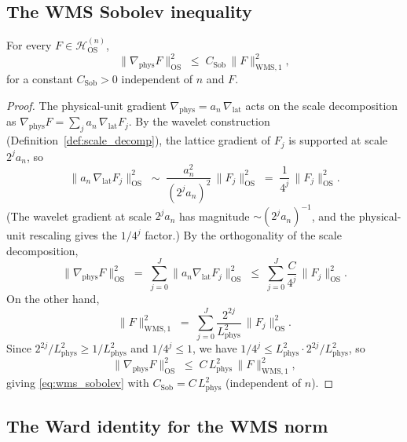 \subsection{The WMS Sobolev inequality}
\label{ssec:wms_sobolev}

\begin{theorem}
\label{thm:wms_sobolev}
For every $F\in\mathcal{H}_{\mathrm{OS}}^{(n)}$,
\begin{equation}
\label{eq:wms_sobolev}
  \|\nabla_{\mathrm{phys}}F\|_{\mathrm{OS}}^{2}
  \;\le\;C_{\mathrm{Sob}}\,\|F\|_{\mathrm{WMS},1}^{2},
\end{equation}
for a constant $C_{\mathrm{Sob}}>0$ independent of $n$ and $F$.
\end{theorem}

\begin{proof}
The physical-unit gradient
$\nabla_{\mathrm{phys}}=a_{n}\,\nabla_{\mathrm{lat}}$ acts on the
scale decomposition as
$\nabla_{\mathrm{phys}}F=\sum_{j}a_{n}\,\nabla_{\mathrm{lat}}F_{j}$.
By the wavelet construction (Definition~\ref{def:scale_decomp}), the
lattice gradient of $F_{j}$ is supported at scale $2^{j}a_{n}$, so
\[
  \|a_{n}\,\nabla_{\mathrm{lat}}F_{j}\|_{\mathrm{OS}}^{2}
  \;\sim\;\frac{a_{n}^{2}}{(2^{j}a_{n})^{2}}\,\|F_{j}\|_{\mathrm{OS}}^{2}
  \;=\;\frac{1}{4^{j}}\,\|F_{j}\|_{\mathrm{OS}}^{2}.
\]
(The wavelet gradient at scale $2^{j}a_{n}$ has magnitude
$\sim(2^{j}a_{n})^{-1}$, and the physical-unit rescaling gives the
$1/4^{j}$ factor.) By the orthogonality of the scale decomposition,
\[
  \|\nabla_{\mathrm{phys}}F\|_{\mathrm{OS}}^{2}
  \;=\;\sum_{j=0}^{J}\|a_{n}\nabla_{\mathrm{lat}}F_{j}\|_{\mathrm{OS}}^{2}
  \;\le\;\sum_{j=0}^{J}\frac{C}{4^{j}}\,\|F_{j}\|_{\mathrm{OS}}^{2}.
\]
On the other hand,
\[
  \|F\|_{\mathrm{WMS},1}^{2}
  \;=\;\sum_{j=0}^{J}\frac{2^{2j}}{L_{\mathrm{phys}}^{2}}\,
  \|F_{j}\|_{\mathrm{OS}}^{2}.
\]
Since $2^{2j}/L_{\mathrm{phys}}^{2}\ge 1/L_{\mathrm{phys}}^{2}$ and
$1/4^{j}\le 1$, we have
$1/4^{j}\le L_{\mathrm{phys}}^{2}\cdot 2^{2j}/L_{\mathrm{phys}}^{2}$,
so
\[
  \|\nabla_{\mathrm{phys}}F\|_{\mathrm{OS}}^{2}
  \;\le\;C\,L_{\mathrm{phys}}^{2}\,\|F\|_{\mathrm{WMS},1}^{2},
\]
giving \eqref{eq:wms_sobolev} with $C_{\mathrm{Sob}}=
C\,L_{\mathrm{phys}}^{2}$ (independent of $n$).
\end{proof}

\subsection{The Ward identity for the WMS norm}
\label{ssec:ward_wms}

